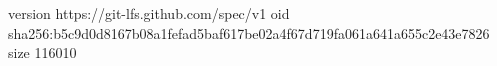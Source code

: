 version https://git-lfs.github.com/spec/v1
oid sha256:b5c9d0d8167b08a1fefad5baf617be02a4f67d719fa061a641a655c2e43e7826
size 116010
